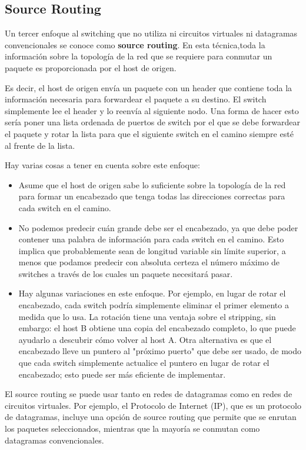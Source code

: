 \subsection{Source Routing}
Un tercer enfoque al switching que no utiliza ni circuitos virtuales ni datagramas convencionales se conoce como \textbf{source routing}. En esta técnica,toda la información sobre la topología de la red que se requiere para conmutar un paquete es proporcionada por el host de origen. 

Es decir, el host de origen envía un paquete con un header que contiene toda la información necesaria para forwardear el paquete a su destino. El switch simplemente lee el header y lo reenvía al siguiente nodo. Una forma de hacer esto sería poner una lista ordenada de puertos de switch por el que se debe forwardear el paquete y rotar la lista para que el siguiente switch en el camino siempre esté al frente de la lista.

Hay varias cosas a tener en cuenta sobre este enfoque:

\begin{itemize}
  \item Asume que el host de origen sabe lo suficiente sobre la topología de la red para formar un encabezado que tenga todas las direcciones correctas para cada switch en el camino.
  \item  No podemos predecir cuán grande debe ser el encabezado, ya que debe poder contener una palabra de información para cada switch en el camino. Esto implica que probablemente sean de longitud variable sin límite superior, a menos que podamos predecir con absoluta certeza el número máximo de switches a través de los cuales un paquete necesitará pasar.
  \item Hay algunas variaciones en este enfoque. Por ejemplo, en lugar de rotar el encabezado, cada switch podría simplemente eliminar el primer elemento a medida que lo usa. La rotación tiene una ventaja sobre el stripping, sin embargo: el host B obtiene una copia del encabezado completo, lo que puede ayudarlo a descubrir cómo volver al host A. Otra alternativa es que el encabezado lleve un puntero al "próximo puerto" que debe ser usado, de modo que cada switch simplemente actualice el puntero en lugar de rotar el encabezado; esto puede ser más eficiente de implementar.
\end{itemize}

El source routing se puede usar tanto en redes de datagramas como en redes de circuitos virtuales. Por ejemplo, el Protocolo de Internet (IP), que es un protocolo de datagramas, incluye una opción de source routing que permite que se enrutan los paquetes seleccionados, mientras que la mayoría se conmutan como datagramas convencionales.

